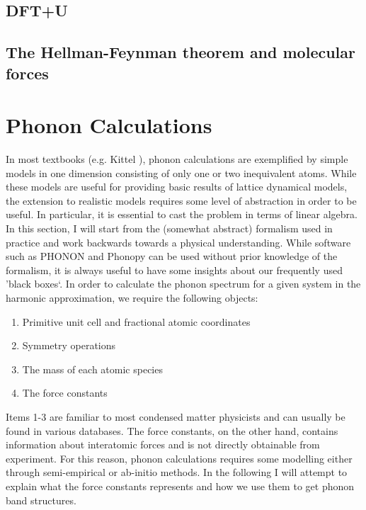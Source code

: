 \subsection{DFT+U}\label{sec:ldau}

\subsection{The Hellman-Feynman theorem and molecular forces}

\section{Phonon Calculations}\label{sec:phonon_calc}
In most textbooks (e.g. Kittel \cite{Kittel2005}), phonon calculations are exemplified by simple models in one dimension consisting of only one or two inequivalent atoms. While these models are useful for providing basic results of lattice dynamical models, the extension to realistic models requires some level of abstraction in order to be useful. In particular, it is essential to cast the problem in terms of linear algebra. In this section, I will start from the (somewhat abstract) formalism used in practice and work backwards towards a physical understanding. While software such as PHONON \cite{Parlinski1997} and Phonopy \cite{Togo2015} can be used without prior knowledge of the formalism, it is always useful to have some insights about our frequently used 'black boxes`. In order to calculate the phonon spectrum for a given system in the harmonic approximation, we require the following objects:

\begin{enumerate}
	\item Primitive unit cell and fractional atomic coordinates
	\item Symmetry operations
	\item The mass of each atomic species
	\item The force constants
\end{enumerate}

Items 1-3 are familiar to most condensed matter physicists and can usually be found in various databases. The force constants, on the other hand, contains information about interatomic forces and is not directly obtainable from experiment. For this reason, phonon calculations requires some modelling either through semi-empirical or ab-initio methods. In the following I will attempt to explain what the force constants represents and how we use them to get phonon band structures.


